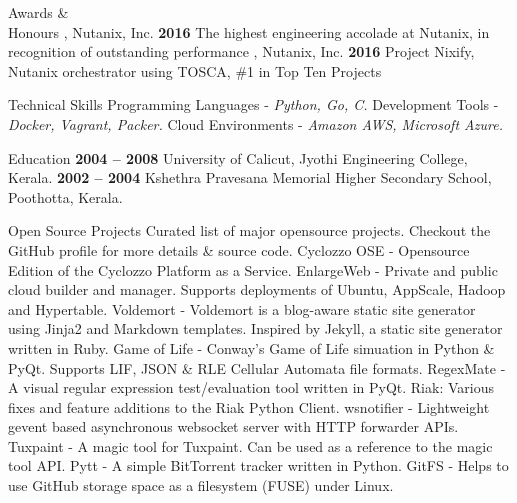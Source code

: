 \documentclass{resume}
\begin{document}

 \begin{category}{Awards \&\\ Honours}
  , {Nutanix, Inc.} \hfill \textbf{2016}
  \citemnobullet The highest engineering accolade at Nutanix, in recognition of outstanding performance
  , { Nutanix, Inc.} \hfill \textbf{2016}
  \citemnobullet Project Nixify, Nutanix orchestrator using TOSCA, \#1 in Top Ten Projects
 \end{category}


\begin{category}{Technical Skills}
  \citembullet Programming Languages - \textit{Python, Go, C.}
  \citembullet Development Tools - \textit{Docker, Vagrant, Packer.}
  \citembullet Cloud Environments - \textit{Amazon AWS, Microsoft Azure.}
\end{category}


\begin{category}{Education}
   \hfill \textbf{2004 -- 2008}
  \citemnobullet University of Calicut, Jyothi Engineering College, Kerala.
   \hfill \textbf{2002 -- 2004}
  \citemnobullet Kshethra Pravesana Memorial Higher Secondary School, Poothotta, Kerala.
\end{category}


\begin{category}{Open Source Projects}
  \citemnobullet Curated list of major opensource projects. Checkout the GitHub profile for more details \& source code.
  \citembullet Cyclozzo OSE - Opensource Edition of the Cyclozzo Platform as a Service.
  \citembullet EnlargeWeb - Private and public cloud builder and manager. Supports deployments of Ubuntu, AppScale, Hadoop and Hypertable.
  \citembullet Voldemort - Voldemort is a blog-aware static site generator using Jinja2 and Markdown templates. Inspired by Jekyll, a static site generator written in Ruby.
  \citembullet Game of Life - Conway's Game of Life simuation in Python \& PyQt. Supports LIF, JSON \&
  RLE Cellular Automata file formats.
  \citembullet RegexMate - A visual regular expression test/evaluation tool written in PyQt.
  \citembullet Riak: Various fixes and feature additions to
  the Riak Python Client.
  \citembullet wsnotifier - Lightweight gevent based asynchronous websocket server with HTTP forwarder APIs.
  \citembullet Tuxpaint - A magic tool for Tuxpaint. Can be used as a reference to the magic tool API.
  \citembullet Pytt - A simple BitTorrent tracker written in Python.
  \citembullet GitFS - Helps to use GitHub storage space as a filesystem (FUSE) under Linux.
\end{category}
\end{document}
